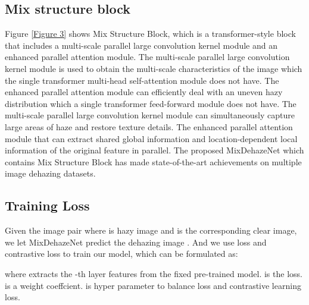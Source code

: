 \documentclass[10pt,twocolumn,letterpaper]{article}
\begin{document}
\subsection{Mix structure block}
Figure \ref{Figure 3} shows Mix Structure Block, which is a transformer-style block that includes a multi-scale parallel large convolution kernel module and an enhanced parallel attention module. The multi-scale parallel large convolution kernel module is used to obtain the multi-scale characteristics of the image which the single transformer \cite{vit,swinTransformer} multi-head self-attention module does not have. The enhanced parallel attention module can efficiently deal with an uneven hazy distribution which a single transformer \cite{vit,swinTransformer} feed-forward module does not have. The multi-scale parallel large convolution kernel module can simultaneously capture large areas of haze and restore texture details. The enhanced parallel attention module that can extract shared global information and location-dependent local information of the original feature in parallel. The proposed MixDehazeNet which contains Mix Structure Block has made state-of-the-art achievements on multiple image dehazing datasets.

\subsection{Training Loss}
Given the image pair {} where {} is hazy image and {} is the corresponding clear image, we let MixDehazeNet predict the dehazing image .  And we use  loss and contrastive loss to train our model, which can be formulated as:

where  extracts the -th layer features from the fixed pre-trained model.  is the  loss.  is a weight coeffcient.  is hyper parameter to balance  loss and contrastive learning loss.
\end{document}
